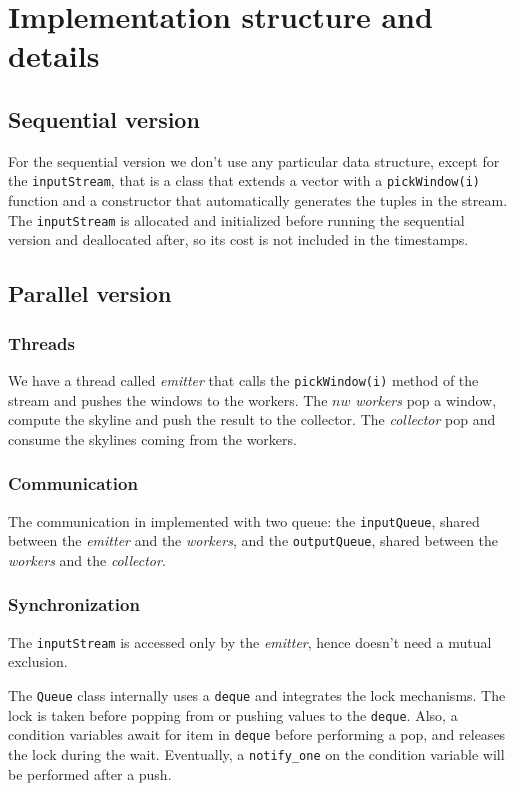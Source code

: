 \section{Implementation structure and details}

\subsection{Sequential version}
For the sequential version we don't use any particular data structure, except for the \texttt{inputStream}, that is a class that extends a vector with a \texttt{pickWindow(i)} function and a constructor that automatically generates the tuples in the stream. The \texttt{inputStream} is allocated and initialized before running the sequential version and deallocated after, so its cost is not included in the timestamps.



\subsection{Parallel version}
\subsubsection{Threads}
We have a thread called \textit{emitter} that calls the \texttt{pickWindow(i)} method of the stream and pushes the windows to the workers. The $nw$ \textit{workers} pop a window, compute the skyline and push the result to the collector. The \textit{collector} pop and consume the skylines coming from the workers.

\subsubsection{Communication}
The communication in implemented with two queue: the \texttt{inputQueue}, shared between the \textit{emitter} and the \textit{workers}, and the \texttt{outputQueue}, shared between the \textit{workers} and the \textit{collector}.

\subsubsection{Synchronization}
The \texttt{inputStream} is accessed only by the \textit{emitter}, hence doesn't need a mutual exclusion.

The \texttt{Queue} class internally uses a \texttt{deque} and integrates the lock mechanisms. The lock is taken before popping from or pushing values to the \texttt{deque}. Also, a condition variables await for item in \texttt{deque} before performing a pop, and releases the lock during the wait. Eventually, a \texttt{notify\_one} on the condition variable will be performed after a push.

